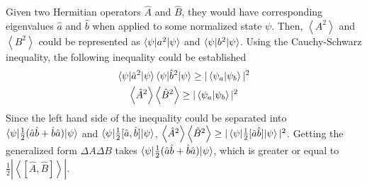 \documentclass[10pt,letterpaper]{article}
\begin{document}
\begin{enumerate}
\begin{enumerate}
\color{violet}
Given two Hermitian operators $\hat{A}$ and $\hat{B}$, they would have corresponding eigenvalues $\hat{a}$ and $\hat{b}$ when applied to some normalized state $\psi$. Then, $\left\langle A^{2} \right\rangle$ and $\left\langle B^{2} \right\rangle$ could be represented as $\braket{\psi | a^{2} | \psi}$ and $\braket{\psi | b^{2} | \psi}$. Using the Cauchy-Schwarz inequality, the following inequality could be established
\begin{gather*}
\braket{\psi | \hat{a}^{2} | \psi}\braket{\psi | \hat{b}^{2} | \psi} \geq |\braket{\psi_{a} | \psi_{b}}|^{2} \\
\left\langle \hat{A}^{2} \right\rangle \left\langle \hat{B}^{2} \right\rangle \geq |\braket{\psi_{a} | \psi_{b}}|^{2}
\end{gather*}
Since the left hand side of the inequality could be separated into $\braket{\psi | \frac{1}{2}(\hat{a}\hat{b} + \hat{b}\hat{a}) | \psi}$ and $\braket{\psi | \frac{1}{2}[\hat{a}, \hat{b}] | \psi}$, $\left\langle \hat{A}^{2} \right\rangle \left\langle \hat{B}^{2} \right\rangle \geq | \braket{\psi | \frac{1}{2}[\hat{a}\hat{b}] | \psi } |^{2}$. Getting the generalized form $\Delta A  \Delta B$ takes $\braket{\psi | \frac{1}{2}(\hat{a}\hat{b} + \hat{b}\hat{a}) | \psi }$, which is greater or equal to $\frac{1}{2}\left| \left\langle \left[ \hat{A}, \hat{B} \right] \right\rangle \right|$. 
\color{black}

\end{enumerate}

\end{enumerate}
\end{document}
